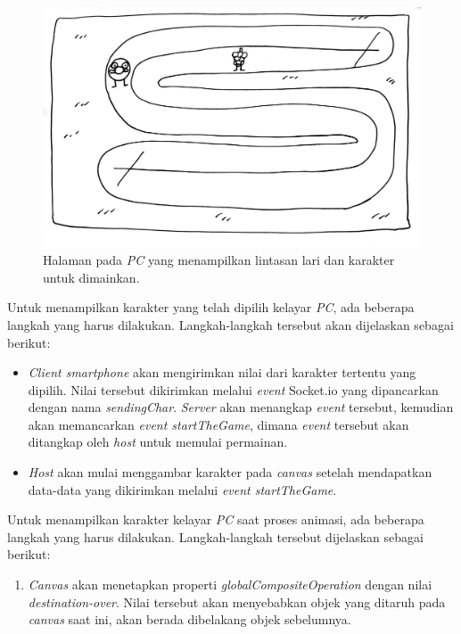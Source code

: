 \begin{enumerate}
\begin{figure}[H]
	\centering
	\includegraphics[scale=0.1]{Gambar/web5_gameplay2}
	\caption{Halaman pada \textit{PC} yang menampilkan lintasan lari dan karakter untuk dimainkan.}
	\label{fig:web5_gameplay2}
\end{figure}
	Untuk menampilkan karakter yang telah dipilih kelayar \textit{PC}, ada beberapa langkah yang harus dilakukan. Langkah-langkah tersebut akan dijelaskan sebagai berikut:
	\begin{itemize}
		\item \textit{Client smartphone} akan mengirimkan nilai dari karakter tertentu yang dipilih. Nilai tersebut dikirimkan melalui \textit{event} Socket.io yang dipancarkan dengan nama \textit{sendingChar}. \textit{Server} akan menangkap \textit{event} tersebut, kemudian akan memancarkan \textit{event startTheGame}, dimana \textit{event} tersebut akan ditangkap oleh \textit{host} untuk memulai permainan.
		
		\item \textit{Host} akan mulai menggambar karakter pada \textit{canvas} setelah mendapatkan data-data yang dikirimkan melalui \textit{event startTheGame}.
		
		 
	\end{itemize}
	
	Untuk menampilkan karakter kelayar \textit{PC} saat proses animasi, ada beberapa langkah yang harus dilakukan. Langkah-langkah tersebut dijelaskan sebagai berikut:
	\begin{enumerate}
		\item \textit{Canvas} akan menetapkan properti \textit{globalCompositeOperation} dengan nilai \textit{destination-over}. Nilai tersebut akan menyebabkan objek yang ditaruh pada \textit{canvas} saat ini, akan berada dibelakang objek sebelumnya.
		

\end{enumerate}
\end{enumerate}
